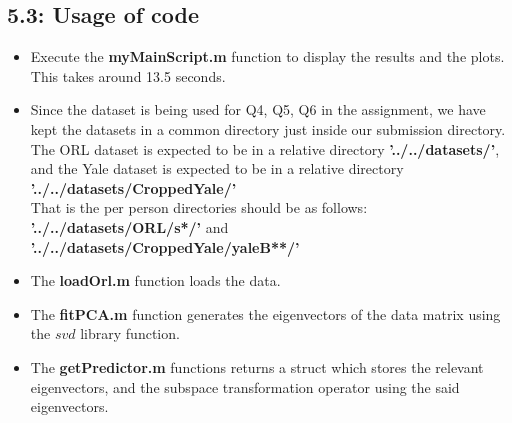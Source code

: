\documentclass[12pt, a4paper]{article}
\begin{document}
\subsection*{5.3: Usage of code}
\begin{itemize}
\item Execute the \textbf{myMainScript.m} function to display the results and the plots. This takes around 13.5 seconds.

\item Since the dataset is being used for Q4, Q5, Q6 in the assignment, we have kept the datasets in a common directory just inside our submission directory. The ORL dataset is expected to be in a relative directory \textbf{'../../datasets/'}, and the Yale dataset is expected to be in a relative directory \textbf{'../../datasets/CroppedYale/'} \\ 
That is the per person directories should be as follows: \\\textbf{'../../datasets/ORL/s*/'} and \\\textbf{'../../datasets/CroppedYale/yaleB**/'}

\item The \textbf{loadOrl.m} function loads the data.

\item The \textbf{fitPCA.m} function generates the eigenvectors of the data matrix using the $svd$ library function.

\item The \textbf{getPredictor.m} functions returns a struct which stores the relevant eigenvectors, and the subspace transformation operator using the said eigenvectors.

\end{itemize}
\end{document}
